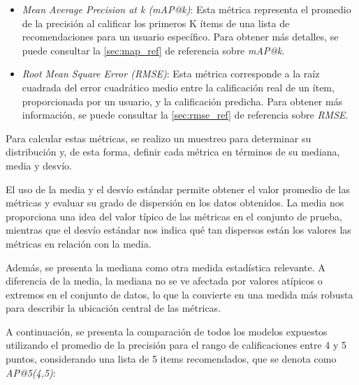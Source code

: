 \documentclass[11pt,a4paper,twoside]{thesis}
\begin{document}
\begin{itemize}
	\item \textit{Mean Average Precision at k (mAP@k)}: Esta métrica
	      representa el promedio de la precisión al calificar los primeros
	      K ítems de una lista de recomendaciones para un usuario específico.
	      Para obtener más detalles, se puede consultar la
	      \autoref{sec:map_ref} de referencia sobre \textit{mAP@k}.
	\item \textit{Root Mean Square Error (RMSE)}: Esta métrica
	      corresponde a la raíz cuadrada del error cuadrático medio entre
	      la calificación real de un ítem, proporcionada por un usuario,
	      y la calificación predicha. Para obtener más información, se
	      puede consultar la \autoref{sec:rmse_ref} de referencia
	      sobre \textit{RMSE}.
\end{itemize}

Para calcular estas métricas, se realizo un muestreo para determinar su
distribución y, de esta forma, definir cada métrica en términos de su mediana,
media y desvío.

El uso de la media y el desvío estándar permite obtener el valor promedio de
las métricas y evaluar su grado de dispersión en los datos obtenidos. La media
nos proporciona una idea del valor típico de las métricas en el conjunto de
prueba, mientras que el desvío estándar nos indica qué tan dispersos están los
valores las métricas en relación con la media.

Además, se presenta la mediana como otra medida estadística relevante. A
diferencia de la media, la mediana no se ve afectada por valores atípicos o
extremos en el conjunto de datos, lo que la convierte en una medida más robusta
para describir la ubicación central de las métricas.

A continuación, se presenta la comparación de todos los modelos expuestos
utilizando el promedio de la precisión para el rango de calificaciones entre 4
y 5 puntos, considerando una lista de 5 items recomendados, que se denota como
\textit{AP@5(4,5)}:
\end{document}
